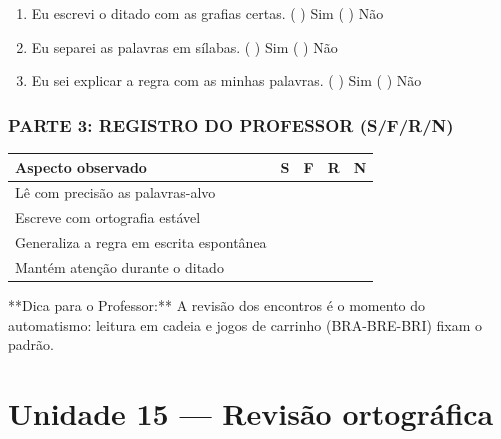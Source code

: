 \begin{exercicio}
\begin{enumerate}[label=\alph*)]
  \item Eu escrevi o ditado com as grafias certas.  \quad ( ) Sim   ( ) Não

  \item Eu separei as palavras em sílabas.  \quad ( ) Sim   ( ) Não

  \item Eu sei explicar a regra com as minhas palavras.  \quad ( ) Sim   ( ) Não

\end{enumerate}

\subsection*{PARTE 3: REGISTRO DO PROFESSOR (S/F/R/N)}

\begin{center}
\renewcommand{\arraystretch}{1.4}
\begin{tabular}{@{}p{9cm}cccc@{}}
\toprule
Aspecto observado & S & F & R & N \\
\midrule
Lê com precisão as palavras-alvo & & & & \\
Escreve com ortografia estável & & & & \\
Generaliza a regra em escrita espontânea & & & & \\
Mantém atenção durante o ditado & & & & \\
\bottomrule\end{tabular}\end{center}

\end{exercicio}

\begin{dica}
**Dica para o Professor:** A revisão dos encontros é o momento do automatismo: leitura em cadeia e jogos de carrinho (BRA-BRE-BRI) fixam o padrão.
\end{dica}


\chapter{Unidade 15 --- Revisão ortográfica}


